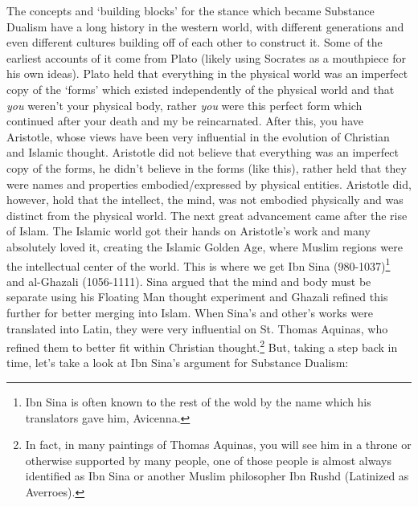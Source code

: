 The concepts and `building blocks' for the stance which became Substance Dualism have a long history in the western world, with different generations and even different cultures building off of each other to construct it. Some of the earliest accounts of it come from Plato (likely using Socrates as a mouthpiece for his own ideas). Plato held that everything in the physical world was an imperfect copy of the `forms' which existed independently of the physical world and that \emph{you} weren't your physical body, rather \emph{you} were this perfect form which continued after your death and my be reincarnated. After this, you have Aristotle, whose views have been very influential in the evolution of Christian and Islamic thought. Aristotle did not believe that everything was an imperfect copy of the forms, he didn’t believe in the forms (like this), rather held that they were names and properties embodied/expressed by physical entities. Aristotle did, however, hold that the intellect, the mind, was not embodied physically and was distinct from the physical world. The next great advancement came after the rise of Islam. The Islamic world got their hands on Aristotle's work and many absolutely loved it, creating the Islamic Golden Age, where Muslim regions were the intellectual center of the world. This is where we get Ibn Sina (980-1037)\footnote{Ibn Sina is often known to the rest of the wold by the name which his translators gave him, Avicenna.} and al-Ghazali (1056-1111). Sina argued that the mind and body must be separate using his Floating Man thought experiment and Ghazali refined this further for better merging into Islam. When Sina's and other's works were translated into Latin, they were very influential on St. Thomas Aquinas, who refined them to better fit within Christian thought.\footnote{In fact, in many paintings of Thomas Aquinas, you will see him in a throne or otherwise supported by many people, one of those people is almost always identified as Ibn Sina or another Muslim philosopher Ibn Rushd (Latinized as Averroes).} But, taking a step back in time, let's take a look at Ibn Sina's argument for Substance Dualism: 


